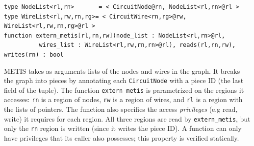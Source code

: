 \begin{lstlisting}[label={lst:metis},caption={Partition Computation}]
type NodeList<rl,rn>       = < CircuitNode@rn, NodeList<rl,rn>@rl >
type WireList<rl,rw,rn,rg>= < CircuitWire<rn,rg>@rw, WireList<rl,rw,rn,rg>@rl >
function extern_metis[rl,rn,rw](node_list : NodeList<rl,rn>@rl,
          wires_list : WireList<rl,rw,rn,rn>@rl), reads(rl,rn,rw), writes(rn) : bool
\end{lstlisting}

METIS takes as arguments lists of the nodes and wires in
the graph.  It breaks the graph into pieces by annotating each 
{\tt CircuitNode} with a piece ID (the last field of the tuple).
The function {\tt extern\_metis} is parametrized on the regions it 
accesses: {\tt rn} is a region of nodes, {\tt rw} is a region of wires, 
and {\tt rl} is a region with the lists of pointers.  The function
also specifies the access {\em privileges} (e.g read, write) it requires for each 
region.  All three regions are read by {\tt extern\_metis}, but only the {\tt rn}
region is written (since it writes the piece ID).  A function can only 
have privileges that its caller also possesses; this property is verified statically. 

